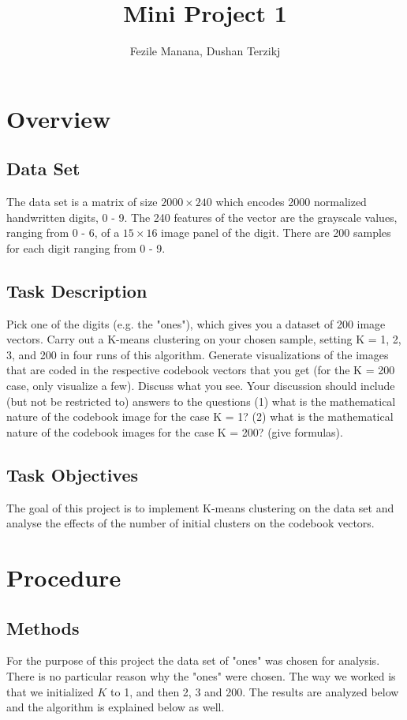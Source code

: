 \documentclass[a4paper, 11pt]{report}
\title{Mini Project 1}
\author{Fezile Manana, Dushan Terzikj}
\begin{document}
\maketitle
\tableofcontents
\pagebreak

\chapter{Overview}
\section{Data Set}
The data set is a matrix of size $2000 \times 240$ which encodes 2000 normalized handwritten digits, 0 - 9. The 240 features of the vector are the grayscale values, ranging from 0 - 6, of a $15 \times 16$ image panel of the digit. There are 200 samples for each digit ranging from 0 - 9.
\section{Task Description}
Pick one of the digits (e.g. the "ones"), which gives you a dataset of 200 image vectors. Carry out a K-means clustering on your chosen sample, setting      K = 1, 2, 3, and 200 in four runs of this algorithm. Generate visualizations of the images that are coded in the respective codebook vectors that you get (for the K = 200 case, only visualize a few). Discuss what you see. Your discussion should include (but not be restricted to) answers to the questions (1) what is the mathematical nature of the codebook image for the case K = 1? (2) what is the mathematical nature of the codebook images for the case K = 200? (give formulas).

\section{Task Objectives}
The goal of this project is to implement K-means clustering on the data set and analyse the effects of the number of initial clusters on the codebook vectors.

\chapter{Procedure}
\section{Methods}
For the purpose of this project the data set of "ones" was chosen for analysis. There is no particular reason why the "ones" were chosen. The way we worked is that we initialized $K$ to 1, and then 2, 3 and 200. The results are analyzed below and the algorithm is explained below as well.
\end{document}
